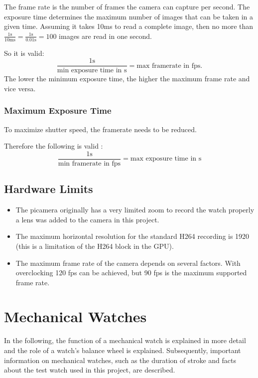 \documentclass[12pt, a4paper]{report}
\begin{document}
    The frame rate is the number of frames the camera can capture per second. The exposure time determines the maximum number of images that can be taken in a given time. Assuming it takes 10ms to read a complete image, then no more than $\frac{1 \text{s} }{10 \text{ms}} = \frac{1\text{s}}{0.01\text{s}} = 100 $ images are read in one second. 
    
    \bigskip
    
    So it is valid: 
    \begin{displaymath}
    \frac{1\text{s}}{\text{min exposure time in s}} = \text{max framerate in
    fps.} 
    \end{displaymath}
    The lower the minimum exposure time, the higher the maximum frame rate and vice versa.
    
    \subsubsection{Maximum Exposure Time}
    To maximize shutter speed, the framerate needs to be reduced. 
       \newline
      
        \bigskip
    Therefore the following is valid :
    \begin{displaymath}
    \frac{1\text{s}}{\text{min framerate in fps}} = \text{max exposure time
    in s}
    \end{displaymath} 
    
    \subsection{Hardware Limits}
    
    \begin{itemize}
    \item The picamera originally has a very limited zoom to record the watch properly a lens was added to the camera in this project.
    \item The maximum horizontal resolution for the standard H264 recording is 1920 (this is a limitation of the H264 block in the GPU).
    \item The maximum frame rate of the camera depends on several factors. With overclocking 120 fps can be achieved, but 90 fps is the maximum supported frame rate.
    
    \end{itemize}
    
    
    \section{Mechanical Watches}  
    In the following, the function of a mechanical watch is explained in more detail and the role of a watch's balance wheel is explained. Subsequently, important information on mechanical watches, such as the duration of stroke and facts about the test watch used in this project, are described.
\end{document}
